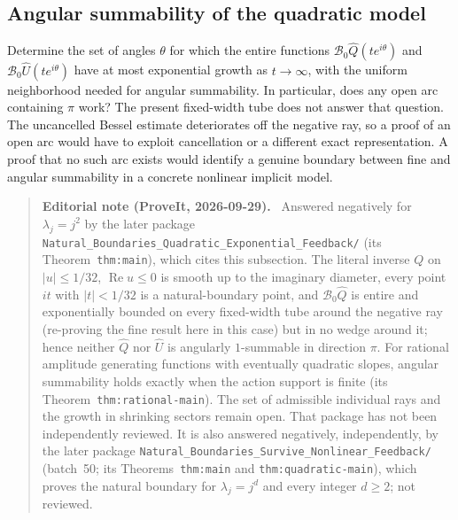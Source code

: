 \documentclass[11pt,a4paper]{article}
\numberwithin{equation}{section}
\theoremstyle{definition}
\theoremstyle{remark}
\newcommand{\U}{\widehat U}
\newcommand{\Q}{\widehat Q}
\newcommand{\B}{\mathcal B_0}
\newcommand{\Ree}{\operatorname{Re}}
\newenvironment{ednote}{\par\smallskip\begin{quote}\small\raggedright\textbf{Editorial note (ProveIt, 2026-09-29).}\ }{\end{quote}\smallskip}
\begin{document}
\subsection{Angular summability of the quadratic model}
Determine the set of angles $\theta$ for which the entire functions
$\B\Q(te^{i\theta})$ and $\B\U(te^{i\theta})$ have at most exponential
growth as $t\to\infty$, with the uniform neighborhood needed for angular
summability.  In particular, does any open arc containing $\pi$ work?
The present fixed-width tube does not answer that question.  The
uncancelled Bessel estimate deteriorates off the negative ray, so a proof
of an open arc would have to exploit cancellation or a different exact
representation.  A proof that no such arc exists would identify a genuine
boundary between fine and angular summability in a concrete nonlinear
implicit model.
\begin{ednote}
Answered negatively for $\lambda_j=j^2$ by the later package
\nolinkurl{Natural_Boundaries_Quadratic_Exponential_Feedback/} (its
Theorem~\texttt{thm:main}), which cites this subsection. The literal inverse $Q$ on
$|u|\le1/32$, $\Ree u\le0$ is smooth up to the imaginary diameter, every
point $it$ with $|t|<1/32$ is a natural-boundary point, and $\B\Q$ is
entire and exponentially bounded on every fixed-width tube around the
negative ray (re-proving the fine result here in this case) but in no
wedge around it; hence neither $\Q$ nor $\U$ is angularly $1$-summable in
direction $\pi$. For rational amplitude generating functions with
eventually quadratic slopes, angular summability holds exactly when the
action support is finite (its Theorem~\texttt{thm:rational-main}). The set of
admissible individual rays and the growth in shrinking sectors remain
open. That package has not been independently reviewed.
It is also answered negatively, independently, by the later package
\nolinkurl{Natural_Boundaries_Survive_Nonlinear_Feedback/} (batch~50; its
Theorems~\texttt{thm:main} and \texttt{thm:quadratic-main}), which proves the
natural boundary for $\lambda_j=j^d$ and every integer $d\ge2$; not
reviewed.
\end{ednote}
\end{document}
